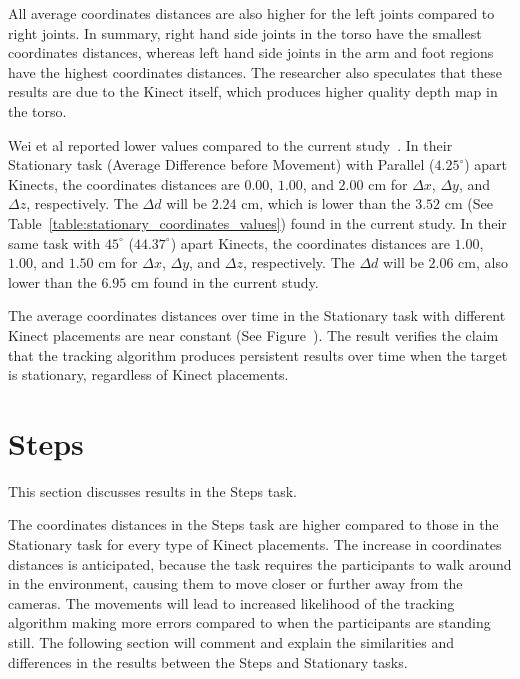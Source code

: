 All average coordinates distances are also higher for the left joints compared to right joints. In summary, right hand side joints in the torso have the smallest coordinates distances, whereas left hand side joints in the arm and foot regions have the highest coordinates distances. The researcher also speculates that these results are due to the Kinect itself, which produces higher quality depth map in the torso.

Wei et al reported lower values compared to the current study~\cite{wei_kinect_calibration}. In their Stationary task (Average Difference before Movement) with Parallel ($4.25^{\circ}$) apart Kinects, the coordinates distances are $0.00$, $1.00$, and $2.00$ cm for $\Delta x$, $\Delta y$, and $\Delta z$, respectively. The $\Delta d$ will be $2.24$ cm, which is lower than the $3.52$ cm (See Table~\ref{table:stationary_coordinates_values}) found in the current study. In their same task with $45^{\circ}$ ($44.37^{\circ}$) apart Kinects, the coordinates distances are $1.00$, $1.00$, and $1.50$ cm for $\Delta x$, $\Delta y$, and $\Delta z$, respectively. The $\Delta d$ will be $2.06$ cm, also lower than the $6.95$ cm found in the current study.

The average coordinates distances over time in the Stationary task with different Kinect placements are near constant (See Figure~). The result verifies the claim that the tracking algorithm produces persistent results over time when the target is stationary, regardless of Kinect placements.

\section{Steps}
\label{sec:discussion_steps}

This section discusses results in the Steps task.

The coordinates distances in the Steps task are higher compared to those in the Stationary task for every type of Kinect placements. The increase in coordinates distances is anticipated, because the task requires the participants to walk around in the environment, causing them to move closer or further away from the cameras. The movements will lead to increased likelihood of the tracking algorithm making more errors compared to when the participants are standing still. The following section will comment and explain the similarities and differences in the results between the Steps and Stationary tasks.

